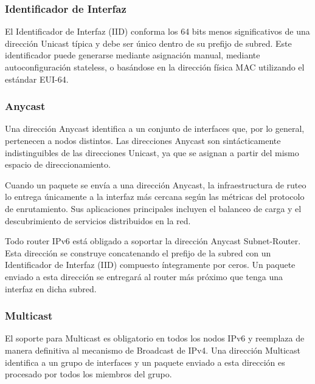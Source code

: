 \subsubsection{Identificador de Interfaz}
El Identificador de Interfaz (IID) conforma los 64 bits menos significativos de una dirección Unicast típica y debe ser único dentro de su prefijo de subred. Este identificador puede generarse mediante asignación manual, mediante autoconfiguración stateless, o basándose en la dirección física MAC utilizando el estándar EUI-64.



\subsubsection{Anycast}

Una dirección Anycast identifica a un conjunto de interfaces que, por lo general, pertenecen a nodos distintos. Las direcciones Anycast son sintácticamente indistinguibles de las direcciones Unicast, ya que se asignan a partir del mismo espacio de direccionamiento. 

Cuando un paquete se envía a una dirección Anycast, la infraestructura de ruteo lo entrega únicamente a la interfaz más cercana según las métricas del protocolo de enrutamiento. Sus aplicaciones principales incluyen el balanceo de carga y el descubrimiento de servicios distribuidos en la red.

Todo router IPv6 está obligado a soportar la dirección Anycast Subnet-Router. Esta dirección se construye concatenando el prefijo de la subred con un Identificador de Interfaz (IID) compuesto íntegramente por ceros. Un paquete enviado a esta dirección se entregará al router más próximo que tenga una interfaz en dicha subred.

\subsubsection{Multicast}

El soporte para Multicast es obligatorio en todos los nodos IPv6 y reemplaza de manera definitiva al mecanismo de Broadcast de IPv4. Una dirección Multicast identifica a un grupo de interfaces y un paquete enviado a esta dirección es procesado por todos los miembros del grupo.

